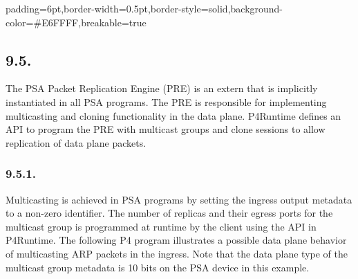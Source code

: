 \documentclass[11pt]{article}
\begin{document}
{%
\begin{mdbmargintb}{6pt}{6pt}%
\begin{mdblock}{padding=6pt,border-width=0.5pt,border-style=solid,background-color=\#E6FFFF,breakable=true}%
\begin{mdpre}%
\end{mdpre}%
\end{mdblock}%
\end{mdbmargintb}%

\subsection{9.5.\hspace*{0.5em}}\label{sec-packetreplicationengineentry}%

\noindent{}The PSA Packet Replication Engine (PRE) is an extern that is implicitly
instantiated in all PSA programs. The PRE is responsible for implementing
multicasting and cloning functionality in the data plane. P4Runtime defines an
API to program the PRE with multicast groups and clone sessions to allow
replication of data plane packets.%

\subsubsection{9.5.1.\hspace*{0.5em}}\label{sec-multicastgroupentry}%

\noindent{}Multicasting is achieved in PSA programs by setting the 
ingress output metadata to a non-zero identifier. The number of replicas and
their egress ports for the multicast group is programmed at runtime by the
client using the  API in P4Runtime. The following P4
program illustrates a possible data plane behavior of multicasting ARP packets
in the ingress. Note that the data plane type of the multicast group metadata is
10 bits on the PSA device in this example.%

}
\end{document}
